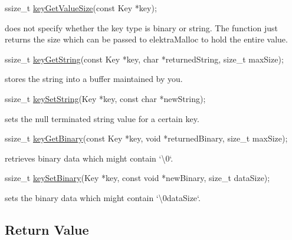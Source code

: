 \begin{DoxyCode}
ssize\_t \hyperlink{group__keyvalue_gae326672fffb7474abfe9baf53b73217e}{keyGetValueSize}(\textcolor{keyword}{const} Key *key);
\end{DoxyCode}


does not specify whether the key type is binary or string. The function just returns the size which can be passed to {\ttfamily elektra\+Malloc} to hold the entire value.


\begin{DoxyCode}
ssize\_t \hyperlink{group__keyvalue_ga41b9fac5ccddafe407fc0ae1e2eb8778}{keyGetString}(\textcolor{keyword}{const} Key *key, \textcolor{keywordtype}{char} *returnedString, \textcolor{keywordtype}{size\_t} maxSize);
\end{DoxyCode}


stores the string into a buffer maintained by you.


\begin{DoxyCode}
ssize\_t \hyperlink{group__keyvalue_ga622bde1eb0e0c4994728331326340ef2}{keySetString}(Key *key, \textcolor{keyword}{const} \textcolor{keywordtype}{char} *newString);
\end{DoxyCode}


sets the null terminated string value for a certain key.


\begin{DoxyCode}
ssize\_t \hyperlink{group__keyvalue_ga4c0d8a4a11174197699c231e0b5c3c84}{keyGetBinary}(\textcolor{keyword}{const} Key *key, \textcolor{keywordtype}{void} *returnedBinary, \textcolor{keywordtype}{size\_t} maxSize);
\end{DoxyCode}


retrieves binary data which might contain `\textquotesingle{}\textbackslash{}0\textquotesingle{}`.


\begin{DoxyCode}
ssize\_t \hyperlink{group__keyvalue_gaa50a5358fd328d373a45f395fa1b99e7}{keySetBinary}(Key *key, \textcolor{keyword}{const} \textcolor{keywordtype}{void} *newBinary, \textcolor{keywordtype}{size\_t} dataSize);
\end{DoxyCode}


sets the binary data which might contain `\textquotesingle{}\textbackslash{}0data\+Size`.

\subsection*{Return Value}


